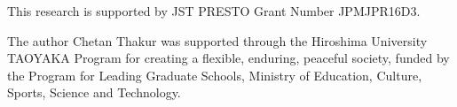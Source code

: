 \documentclass[paper,JRM,paper]{jaciiiarticle}
\begin{document}
This research is supported by JST PRESTO Grant Number JPMJPR16D3.

The author Chetan Thakur was supported through the Hiroshima University
TAOYAKA Program for creating a flexible, enduring, peaceful society, funded by the Program for Leading
Graduate Schools, Ministry of Education, Culture, Sports, Science and Technology.  


%

\end{document}
